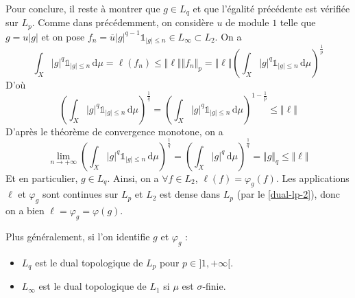 \begin{demonstration}
		Pour conclure, il reste à montrer que $g \in L_q$ et que l'égalité précédente est vérifiée sur $L_p$. Comme dans précédemment, on considère $u$ de module $1$ telle que $g = u \vert g \vert$ et on pose $f_n = \overline{u} \vert g \vert^{q-1} \mathbb{1}_{\vert g \vert \leq n} \in L_\infty \subset L_2$. On a
		\[ \int_X \vert g \vert^q \mathbb{1}_{\vert g \vert \leq n} \, \mathrm{d}\mu = \ell(f_n) \leq \Vert \ell \Vert \Vert f_n \Vert_p = \Vert \ell \Vert \left ( \int_X \vert g \vert^q \mathbb{1}_{\vert g \vert \leq n} \, \mathrm{d}\mu \right )^{\frac{1}{p}} \]
		D'où
		\[ \left ( \int_X \vert g \vert^q \mathbb{1}_{\vert g \vert \leq n} \, \mathrm{d}\mu \right )^{\frac{1}{q}} = \left ( \int_X \vert g \vert^q \mathbb{1}_{\vert g \vert \leq n} \, \mathrm{d}\mu \right )^{1 - \frac{1}{p}} \leq \Vert \ell \Vert \]
		D'après le théorème de convergence monotone, on a
		\[ \lim_{n \rightarrow +\infty} \left ( \int_X \vert g \vert^q \mathbb{1}_{\vert g \vert \leq n} \, \mathrm{d}\mu \right )^{\frac{1}{q}} = \left ( \int_X \vert g \vert^q \, \mathrm{d}\mu \right )^{\frac{1}{q}} = \Vert g \Vert_q \leq \Vert \ell \Vert \]
		Et en particulier, $g \in L_q$. Ainsi, on a $\forall f \in L_2$, $\ell(f) = \varphi_g(f)$. Les applications $\ell$ et $\varphi_g$ sont continues sur $L_p$ et $L_2$ est dense dans $L_p$ (par le \cref{dual-lp-2}), donc on a bien $\ell = \varphi_g = \varphi(g)$.
	\end{demonstration}

	
	\begin{remark}
		Plus généralement, si l'on identifie $g$ et $\varphi_g$ :
		\begin{itemize}
			\item $L_q$ est le dual topologique de $L_p$ pour $p \in ]1, +\infty[$.
			\item $L_\infty$ est le dual topologique de $L_1$ si $\mu$ est $\sigma$-finie.
		\end{itemize}
	\end{remark}

